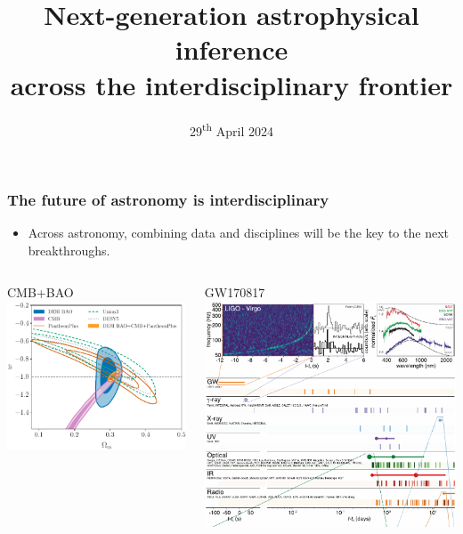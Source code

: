\documentclass[aspectratio=169]{beamer}
\title{Next-generation astrophysical inference\\across the interdisciplinary frontier}
\date{29\textsuperscript{th} April 2024}
\begin{document}
\begin{frame}
    \titlepage
\end{frame}

\begin{frame}
    \frametitle{The future of astronomy is interdisciplinary}
    \begin{itemize}
        \item Across astronomy, combining data and disciplines will be the key to the next breakthroughs.
    \end{itemize}
    \begin{columns}
        \begin{block}{CMB+BAO}
            \includegraphics[width=\textwidth]{figures/desi_w_constraints.pdf}
        \end{block}
        \begin{block}{GW170817}
            \includegraphics[width=\textwidth]{figures/mma_1.pdf}

\end{block}
\end{columns}
\end{frame}
\end{document}
